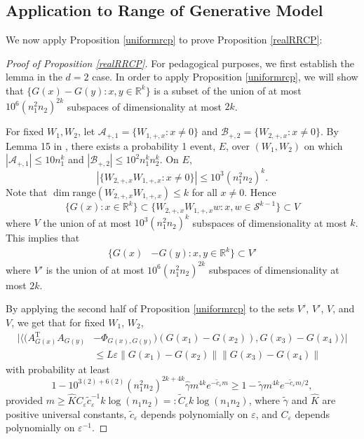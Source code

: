 \documentclass[11pt]{article}
\renewcommand{\epsilon}{\varepsilon}
\newcommand{\R}{\mathbb{R}}
\newcommand{\Seps}{\mathcal{S}}
\newcommand{\G}{G}
\renewcommand{\top}{{\mathrm{T}}}
\theoremstyle{remark}
\begin{document}
\subsection{Application to Range of Generative Model}

We now apply Proposition \ref{uniformrcp} to prove Proposition \ref{realRRCP}:

\begin{proof}[Proof of Proposition \ref{realRRCP}]

For pedagogical purposes, we first establish the lemma in the $d=2$ case. In order to apply Proposition \ref{uniformrcp}, we will show that $\{\G(x) - \G(y) : x,y \in \R^k\}$ is a subset of the union of at most $10^6(n_1^2n_2)^{2k}$ subspaces of dimensionality at most $2k$.

For fixed $W_1,W_2$, let $\mathcal{A}_{+,1} = \{W_{1,+,x} : x \neq 0\}$ and $\mathcal{B}_{+,2} = \{W_{2,+,x} : x \neq 0\}$.  
By Lemma 15 in \cite{HV2017}, there exists a probability 1 event, $E$, over $(W_1,W_2)$ on which $|\mathcal{A}_{+,1}| \leqslant 10 n_1^k$ and $|\mathcal{B}_{+,2}| \leqslant 10^2 n_1^k n_2^k$. 
On $E$, 
\[
|\{ W_{2,+,x}W_{1,+,x} : x \neq 0\}| \leqslant 10^3 (n_1^2 n_2)^k.
\]
 Note that $\dim \text{range}(W_{2,+,x}W_{1,+,x}) \leqslant k$ for all $x \neq 0$.  Hence $$\{\G(x) : x \in \R^k\} \subset \{ W_{2,+,x}W_{1,+,x} w : x, w \in \Seps^{k-1} \} \subset V$$ where $V$ the union of at most $10^3 (n_1^2 n_2)^k$ subspaces of dimensionality at most $k$. This implies that \begin{align*}
    \{\G(x)&-\G(y) : x,y \in \R^k\}
    \subset V'
\end{align*} where $V'$ is the union of at most $10^6(n_1^2n_2)^{2k}$ subspaces of dimensionality at most $2k$.

By applying the second half of Proposition \ref{uniformrcp} to the sets $V'$, $V'$, $V$, and $V$, we get that for fixed $W_1$, $W_2$, \begin{align}
    |\langle (A_{\G(x)}^\top A_{\G(y)} & - \Phi_{\G(x),\G(y)})(\G(x_1) - \G(x_2)), \G(x_3)-\G(x_4)\rangle | \nonumber \\
    & \leqslant L\epsilon\|\G(x_1) - \G(x_2)\|\|\G(x_3)-\G(x_4)\| \label{2_layer_concentration_inequality}
\end{align}
with probability at least $$1 - 10^{3(2) + 6(2)}(n_1^2n_2)^{2k + 4k}\hat{\gamma}m^{4k} e^{-\tilde{c}_{\epsilon} m} \geqslant 1 - \tilde{\gamma}m^{4k}e^{-\tilde{c}_{\epsilon}m/2 },$$ provided $m \geqslant \hat{K}C_{\epsilon}\tilde{c}_{\epsilon}^{-1}k\log(n_1n_2) =: \tilde{C}_{\epsilon}k \log(n_1n_2)$, where $\tilde{\gamma}$ and $\hat{K}$ are positive universal constants, $\tilde{c}_{\epsilon}$ depends polynomially on $\epsilon$, and $C_{\epsilon}$ depends polynomially on $\epsilon^{-1}$.


\end{proof}
\end{document}
